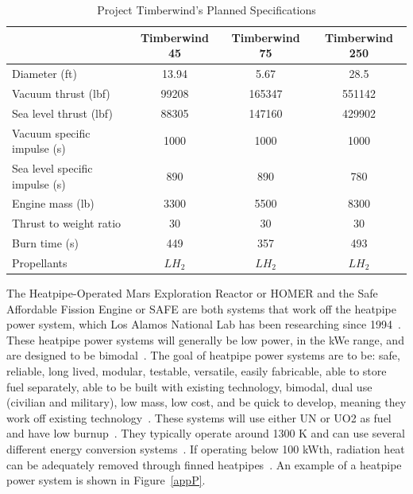 \documentclass{article}
\begin{document}
\begin{table}[]
\centering
\caption{Project Timberwind's Planned Specifications}
\label{appO}
\begin{tabular}{|l|c|c|c|}
\hline
\multicolumn{1}{|c|}{}         & Timberwind 45 & Timberwind 75 & Timberwind 250 \\ \hline
Diameter (ft)                  & 13.94         & 5.67          & 28.5           \\ \hline
Vacuum thrust (lbf)            & 99208         & 165347        & 551142         \\ \hline
Sea level thrust (lbf)         & 88305         & 147160        & 429902         \\ \hline
Vacuum specific impulse (s)    & 1000          & 1000          & 1000           \\ \hline
Sea level specific impulse (s) & 890           & 890           & 780            \\ \hline
Engine mass (lb)               & 3300          & 5500          & 8300           \\ \hline
Thrust to weight ratio         & 30            & 30            & 30             \\ \hline
Burn time (s)                  & 449           & 357           & 493            \\ \hline
Propellants                    & $LH_2$        & $LH_2$        & $LH_2$         \\ \hline
\end{tabular}
\end{table}



The Heatpipe-Operated Mars Exploration Reactor or HOMER and the Safe Affordable Fission Engine or SAFE are both systems that work off the heatpipe power system, which Los Alamos National Lab has been researching since 1994~\cite{poston2001heatpipe}. These heatpipe power systems will generally be low power, in the kWe range, and are designed to be bimodal~\cite{houts1997heatpipe}. The goal of heatpipe power systems are to be: safe, reliable, long lived, modular, testable, versatile, easily fabricable, able to store fuel separately, able to be built with existing technology, bimodal, dual use (civilian and military), low mass, low cost, and be quick to develop, meaning they work off existing technology~\cite{houts1997heatpipe}. These systems will use either UN or UO2 as fuel and have low burnup~\cite{houts1997heatpipe}. They typically operate around 1300 K and can use several different energy conversion systems~\cite{houts1997heatpipe}. If operating below 100 kWth, radiation heat can be adequately removed through finned heatpipes~\cite{houts1997heatpipe}. An example of a heatpipe power system is shown in Figure~\ref{appP}. 
\end{document}
